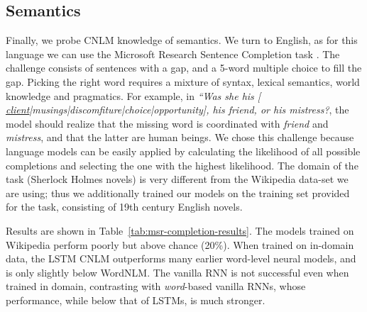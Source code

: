 

\subsection{Semantics}
\label{sec:semantics}

Finally, we probe CNLM knowledge of semantics. We turn to
English, as for this language we can use the Microsoft Research
Sentence Completion task \cite{Zweig:Burges:2011}. The challenge
consists of sentences with a gap, and a 5-word multiple choice to fill
the gap. Picking the right word requires a mixture of syntax, lexical
semantics, world knowledge and pragmatics. For example, in \emph{``Was
  she his [
  \underline{client}|musings|discomfiture|choice|opportunity], his
  friend, or his mistress?}, the model should realize that the
missing word is coordinated with \emph{friend} and \emph{mistress},
and that the latter are human beings. We chose this challenge because
language models can be easily applied by calculating the likelihood of
all possible completions and selecting the one with the highest
likelihood. The domain of the task (Sherlock Holmes novels) is very
different from the Wikipedia data-set we are using; thus we
additionally trained our models on the training set provided for the
task, consisting of 19th century English novels.

Results are shown in Table~\ref{tab:msr-completion-results}.  The
models trained on Wikipedia perform poorly but above chance (20\%).  When trained on in-domain data, the LSTM CNLM outperforms many earlier word-level neural
models, and is only slightly below WordNLM. %
The vanilla RNN is not successful even when trained in domain,
contrasting with \emph{word}-based vanilla RNNs, whose performance,
while below that of LSTMs, is much stronger. %

